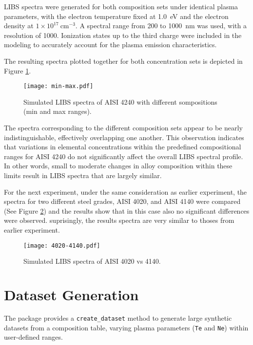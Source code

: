 \documentclass[12pt,a4paper]{article}
\begin{document}
	
	LIBS spectra were generated for both composition sets under identical plasma parameters, with the electron temperature fixed at 1.0~eV and the electron density at $1 \times 10^{17}~\text{cm}^{-3}$. A spectral range from 200 to 1000~nm was used, with a resolution of 1000. Ionization states up to the third charge were included in the modeling to accurately account for the plasma emission characteristics.
	
	The resulting spectra plotted together for both concentration sets is depicted in Figure \ref{fig:min-max}.
	
	
	
	\begin{figure}[h!]
		\centering
		\texttt{[image: min-max.pdf]}
		\caption{Simulated LIBS spectra of AISI 4240 with different sompositions (min and max ranges).}
		\label{fig:min-max}
	\end{figure} 
	The spectra corresponding to the different composition sets appear to be nearly indistinguishable, effectively overlapping one another. This observation indicates that variations in elemental concentrations within the predefined compositional ranges for AISI 4240 do not significantly affect the overall LIBS spectral profile. In other words, small to moderate changes in alloy composition within these limits result in LIBS spectra that are largely similar.
	
	For the next experiment, under the same consideration as earlier experiment, the spectra for two different steel grades, AISI 4020, and AISI 4140 were compared (See Figure \ref{fig:4020-4140}) and the results show that in this case also no significant differences were observed. suprisingly, the results spectra are very similar to thoses from earlier experiment.
	\begin{figure}[h!]
		\centering
		\texttt{[image: 4020-4140.pdf]}
		\caption{Simulated LIBS spectra of AISI 4020 vs 4140.}
		\label{fig:4020-4140}
	\end{figure} 

	
	

	
	\section{Dataset Generation}
	The package provides a \texttt{create\_dataset} method to generate large synthetic datasets from a composition table, varying plasma parameters (\texttt{Te} and \texttt{Ne}) within user-defined ranges.
	
\end{document}
